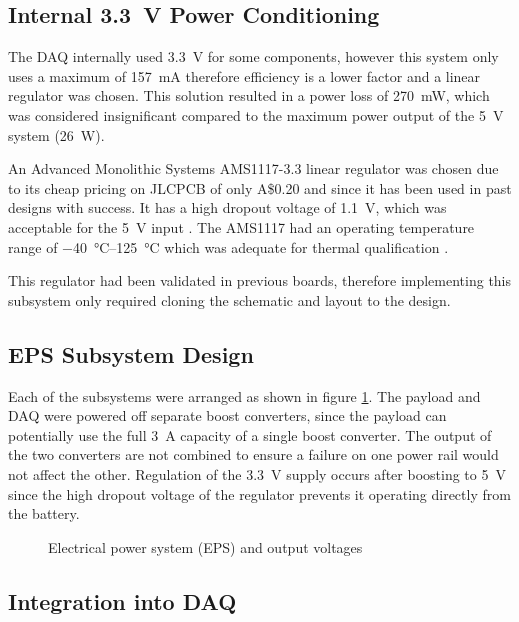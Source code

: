 \documentclass{report}
\newcommand{\aud}{A\$}
\begin{document}
\subsection{Internal \SI{3.3}{\volt} Power Conditioning}

The DAQ internally used \SI{3.3}{\volt} for some components, however this system only uses a maximum of \SI{157}{\milli\ampere} therefore efficiency is a lower factor and a linear regulator was chosen. This solution resulted in a power loss of \SI{270}{\milli\watt}, which was considered insignificant compared to the maximum power output of the \SI{5}{\volt} system (\SI{26}{\watt}). %

An Advanced Monolithic Systems AMS1117-3.3 linear regulator was chosen due to its cheap pricing on JLCPCB of only \aud 0.20 and since it has been used in past designs with success. It has a high dropout voltage of \SI{1.1}{\volt}, which was acceptable for the \SI{5}{\volt} input \cite{ams2007ams1117}. The AMS1117 had an operating temperature range of \SIrange{-40}{125}{\degreeCelsius} which was adequate for thermal qualification \cite{ams2007ams1117}.

This regulator had been validated in previous boards, therefore implementing this subsystem only required cloning the schematic and layout to the design.

\subsection{EPS Subsystem Design}

Each of the subsystems were arranged as shown in figure \ref{fig:power-conditioning}. The payload and DAQ were powered off separate boost converters, since the payload can potentially use the full \SI{3}{\ampere} capacity of a single boost converter. The output of the two converters are not combined to ensure a failure on one power rail would not affect the other. Regulation of the \SI{3.3}{\volt} supply occurs after boosting to \SI{5}{\volt} since the high dropout voltage of the regulator prevents it operating directly from the battery.

\begin{figure}[H]
  \centering
  
  \caption{Electrical power system (EPS) and output voltages}
  \label{fig:power-conditioning}
\end{figure}

\subsection{Integration into DAQ}
\end{document}
